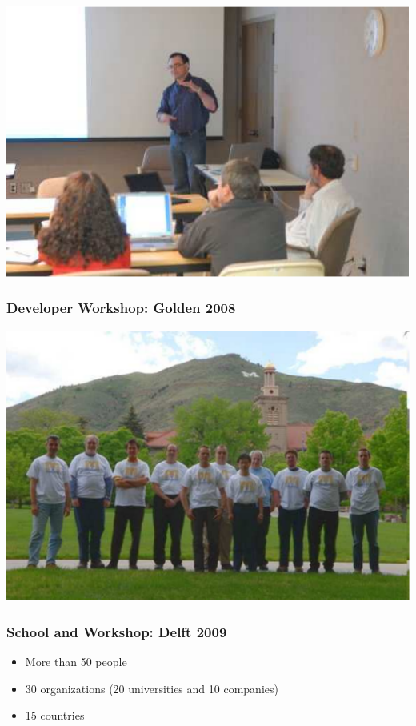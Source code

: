 \begin{frame}
\begin{minipage}{0.45\textwidth}
   \includegraphics[width=\textwidth]{Fig/Sergey}
   \end{minipage}
\end{frame}

\begin{frame}
  \frametitle{Developer Workshop: Golden 2008}
  \includegraphics[height=0.7\textheight]{Fig/RSF2008}
\end{frame}

\begin{frame}
  \frametitle{School and  Workshop: Delft 2009}
  \begin{itemize}
  \item More than 50 people
  \item 30 organizations (20 universities and 10  companies) 
  \item 15 countries  
  \end{itemize}
\end{frame}

